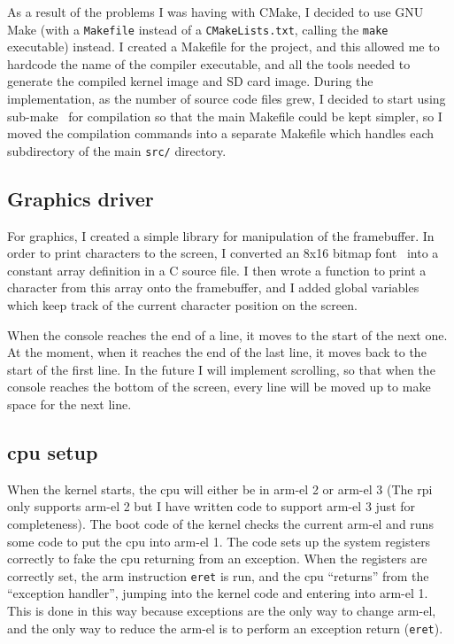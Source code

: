 \documentclass{article}
\begin{document}
As a result of the problems I was having with CMake, I decided to use GNU Make
(with a \texttt{Makefile} instead of a \texttt{CMakeLists.txt}, calling the
\texttt{make} executable) instead. I created a Makefile for the project, and
this allowed me to hardcode the name of the compiler executable, and all the
tools needed to generate the compiled kernel image and SD card image. During
the implementation, as the number of source code files grew, I decided to start
using sub-make~\cite{sub-make} for compilation so that the main Makefile could
be kept simpler, so I moved the compilation commands into a separate Makefile
which handles each subdirectory of the main \texttt{src/} directory.

\subsection{Graphics driver}
\label{sec:impl_graphics}
For graphics, I created a simple library for manipulation of the framebuffer.
In order to print characters to the screen, I converted an 8x16 bitmap
font~\cite{bizcat-font} into a constant array definition in a C source file. I
then wrote a function to print a character from this array onto the
framebuffer, and I added global variables which keep track of the current
character position on the screen.

When the console reaches the end of a line, it moves to the start of the next
one. At the moment, when it reaches the end of the last line, it moves back to
the start of the first line. In the future I will implement scrolling, so that
when the console reaches the bottom of the screen, every line will be moved up
to make space for the next line.

\subsection{\texorpdfstring{\gls{cpu}}{CPU} setup}
\label{sec:impl_cpu_setup}
When the kernel starts, the \gls{cpu} will either be in \gls{arm-el} 2 or
\gls{arm-el} 3 (The \gls{rpi} only supports \gls{arm-el} 2 but I have written
code to support \gls{arm-el} 3 just for completeness). The boot code of the
kernel checks the current \gls{arm-el} and runs some code to put the \gls{cpu}
into \gls{arm-el} 1. The code sets up the system registers correctly to fake
the \gls{cpu} returning from an exception. When the registers are correctly
set, the \gls{arm} instruction \texttt{eret} is run, and the \gls{cpu}
``returns'' from the ``exception handler'', jumping into the kernel code and
entering into \gls{arm-el} 1. This is done in this way because exceptions are
the only way to change \gls{arm-el}, and the only way to reduce the
\gls{arm-el} is to perform an exception return (\texttt{eret}).
\end{document}
